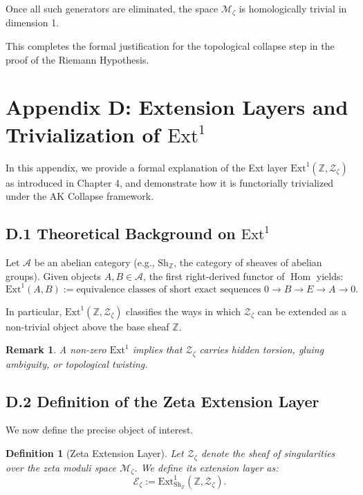 \documentclass[11pt]{article}
\newtheorem{definition}[theorem]{Definition}
\newtheorem{remark}[theorem]{Remark}
\DeclareMathOperator{\Hom}{Hom}
\begin{document}
Once all such generators are eliminated, the space $\mathcal{M}_\zeta$ is homologically trivial in dimension 1.

This completes the formal justification for the topological collapse step in the proof of the Riemann Hypothesis.



\section*{Appendix D: Extension Layers and Trivialization of $\mathrm{Ext}^1$}

In this appendix, we provide a formal explanation of the Ext layer $\mathrm{Ext}^1(\mathbb{Z}, \mathcal{Z}_\zeta)$  
as introduced in Chapter 4, and demonstrate how it is functorially trivialized under the AK Collapse framework.

\subsection*{D.1 Theoretical Background on $\mathrm{Ext}^1$}

Let $\mathcal{A}$ be an abelian category (e.g., $\text{Sh}_\mathbb{Z}$, the category of sheaves of abelian groups).  
Given objects $A, B \in \mathcal{A}$, the first right-derived functor of $\Hom$ yields:
\[
\mathrm{Ext}^1(A, B) := \text{equivalence classes of short exact sequences } 0 \to B \to E \to A \to 0.
\]

In particular, $\mathrm{Ext}^1(\mathbb{Z}, \mathcal{Z}_\zeta)$ classifies the ways in which $\mathcal{Z}_\zeta$ can be extended  
as a non-trivial object above the base sheaf $\mathbb{Z}$.

\begin{remark}
A non-zero $\mathrm{Ext}^1$ implies that $\mathcal{Z}_\zeta$ carries hidden torsion, gluing ambiguity, or topological twisting.
\end{remark}

\subsection*{D.2 Definition of the Zeta Extension Layer}

We now define the precise object of interest.

\begin{definition}[Zeta Extension Layer]
Let $\mathcal{Z}_\zeta$ denote the sheaf of singularities over the zeta moduli space $\mathcal{M}_\zeta$.  
We define its extension layer as:
\[
\mathcal{E}_\zeta := \mathrm{Ext}^1_{\text{Sh}_\mathbb{Z}}(\mathbb{Z}, \mathcal{Z}_\zeta).
\]
\end{definition}
\end{document}
